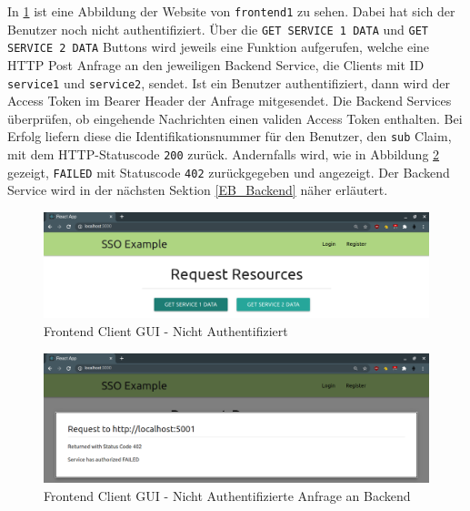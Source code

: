 In \ref{fig:EB_Nicht Authentifiziert} ist eine Abbildung der Website von \texttt{frontend1} zu sehen. Dabei hat sich der Benutzer noch nicht authentifiziert. Über die \texttt{GET SERVICE 1 DATA} und \texttt{GET SERVICE 2 DATA} Buttons wird jeweils eine Funktion aufgerufen, welche eine HTTP Post Anfrage an den jeweiligen Backend Service, die Clients mit ID \texttt{service1} und \texttt{service2}, sendet. Ist ein Benutzer authentifiziert, dann wird der Access Token im Bearer Header der Anfrage mitgesendet. Die Backend Services überprüfen, ob eingehende Nachrichten einen validen Access Token enthalten. Bei Erfolg liefern diese die Identifikationsnummer für den Benutzer, den \texttt{sub} Claim, mit dem HTTP-Statuscode \texttt{200} zurück. Andernfalls wird, wie in Abbildung \ref{fig:EB_Nicht Authentifizierte Anfrage an Backend} gezeigt, \texttt{FAILED} mit Statuscode \texttt{402} zurückgegeben und angezeigt. Der Backend Service wird in der nächsten Sektion \ref{EB_Backend} näher erläutert.

\begin{figure}[!ht]
	\centering
	\includegraphics[width=1\textwidth]{Images/EbertScherer/FrontendLoggedOut.PNG}
	\caption{Frontend Client GUI - Nicht Authentifiziert}
	\label{fig:EB_Nicht Authentifiziert}
\end{figure}

\begin{figure}[!ht]
	\centering
	\includegraphics[width=1\textwidth]{Images/EbertScherer/FrontendLoggedOutBackendRequest.PNG}
	\caption{Frontend Client GUI - Nicht Authentifizierte Anfrage an Backend}
	\label{fig:EB_Nicht Authentifizierte Anfrage an Backend}
\end{figure}

